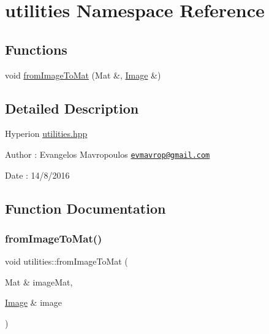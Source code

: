 \hypertarget{namespaceutilities}{}\section{utilities Namespace Reference}
\label{namespaceutilities}
\subsection*{Functions}
\begin{DoxyCompactItemize}
\item 
void \mbox{\hyperlink{namespaceutilities_a60655f0fbe101ac1d89949e25b2a7076}{from\+Image\+To\+Mat}} (Mat \&, \mbox{\hyperlink{classImage}{Image}} \&)
\end{DoxyCompactItemize}


\subsection{Detailed Description}
Hyperion \mbox{\hyperlink{utilities_8hpp_source}{utilities.\+hpp}}

\begin{DoxyAuthor}{Author}
\+: Evangelos Mavropoulos \href{mailto:evmavrop@gmail.com}{\tt evmavrop@gmail.\+com} 
\end{DoxyAuthor}
\begin{DoxyDate}{Date}
\+: 14/8/2016 
\end{DoxyDate}


\subsection{Function Documentation}
\mbox{\label{namespaceutilities_a60655f0fbe101ac1d89949e25b2a7076}} 
\subsubsection{\texorpdfstring{from\+Image\+To\+Mat()}{fromImageToMat()}}
{\footnotesize\ttfamily void utilities\+::from\+Image\+To\+Mat (\begin{DoxyParamCaption}\item[{Mat \&}]{image\+Mat,  }\item[{\mbox{\hyperlink{classImage}{Image}} \&}]{image }\end{DoxyParamCaption})}

